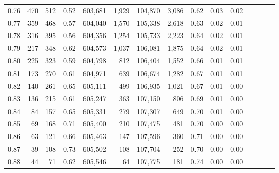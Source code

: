 \begin{tabular}{rrrcrrrrrrrrrrr}
0.76 &     470 &    512 &                                       0.52 &  603,681 &    1,929 &  104,870 &    3,086 &  0.62 &  0.03 &                         0.02 \\
0.77 &     359 &    468 &                                       0.57 &  604,040 &    1,570 &  105,338 &    2,618 &  0.63 &  0.02 &                         0.01 \\
0.78 &     316 &    395 &                                       0.56 &  604,356 &    1,254 &  105,733 &    2,223 &  0.64 &  0.02 &                         0.01 \\
0.79 &     217 &    348 &                                       0.62 &  604,573 &    1,037 &  106,081 &    1,875 &  0.64 &  0.02 &                         0.01 \\
0.80 &     225 &    323 &                                       0.59 &  604,798 &      812 &  106,404 &    1,552 &  0.66 &  0.01 &                         0.01 \\
0.81 &     173 &    270 &                                       0.61 &  604,971 &      639 &  106,674 &    1,282 &  0.67 &  0.01 &                         0.01 \\
0.82 &     140 &    261 &                                       0.65 &  605,111 &      499 &  106,935 &    1,021 &  0.67 &  0.01 &                         0.00 \\
0.83 &     136 &    215 &                                       0.61 &  605,247 &      363 &  107,150 &      806 &  0.69 &  0.01 &                         0.00 \\
0.84 &      84 &    157 &                                       0.65 &  605,331 &      279 &  107,307 &      649 &  0.70 &  0.01 &                         0.00 \\
0.85 &      69 &    168 &                                       0.71 &  605,400 &      210 &  107,475 &      481 &  0.70 &  0.00 &                         0.00 \\
0.86 &      63 &    121 &                                       0.66 &  605,463 &      147 &  107,596 &      360 &  0.71 &  0.00 &                         0.00 \\
0.87 &      39 &    108 &                                       0.73 &  605,502 &      108 &  107,704 &      252 &  0.70 &  0.00 &                         0.00 \\
0.88 &      44 &     71 &                                       0.62 &  605,546 &       64 &  107,775 &      181 &  0.74 &  0.00 &                         0.00 \\

\end{tabular}
